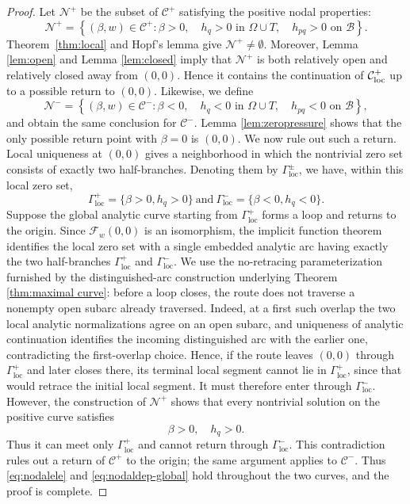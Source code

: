 \documentclass[12pt,letterpaper]{amsart}
\numberwithin{equation}{section}
\begin{document}
	\begin{proof}
		{Let $\mathcal N^+$ be the subset of $\mathcal C^+$ satisfying the positive nodal properties:}
		\begin{equation*}
			\mathcal{N}^+ = \left\{ (\beta,w) \in \mathcal{C}^+ : \beta > 0, \quad h_q > 0 \text{ in } \Omega \cup T, \quad h_{pq} > 0 {\text{ on }\mathcal B} \right\}.
		\end{equation*}
		{Theorem~\ref{thm:local} and Hopf's lemma give $\mathcal N^+\ne\emptyset$.} Moreover, Lemma \ref{lem:open} and Lemma \ref{lem:closed} imply that $\mathcal N^+$ is both relatively open and relatively closed away from $(0,0)$. Hence it contains the continuation of $\mathcal C_{\rm loc}^+$ up to a possible return to $(0,0)$. Likewise, we define
		\[\mathcal{N}^- = \left\{ (\beta,w) \in \mathcal{C}^- : \beta < 0, \quad h_q < 0 \text{ in } \Omega \cup T, \quad h_{pq} < 0 {\text{ on }\mathcal B} \right\},\]
		and obtain the same conclusion for $\mathcal C^-$. Lemma \ref{lem:zeropressure} shows that the only possible return point with $\beta=0$ is $(0,0)$. We now rule out such a return. {Local uniqueness at $(0,0)$ gives a neighborhood in which the nontrivial zero set consists of exactly two half-branches. Denoting them by $\Gamma_{\mathrm{loc}}^\pm$, we have, within this local zero set,}
 \begin{equation*}
 	\Gamma^+_{\mathrm{loc}}=\{\beta>0,h_q>0\}\mathrm{~and~}\Gamma^-_{\mathrm{loc}}=\{\beta<0,h_q<0\}.
 	\end{equation*}
	{Suppose the global analytic curve starting from $\Gamma^+_{\mathrm{loc}}$ forms a loop and returns to the origin. Since $\mathcal F_w(0,0)$ is an isomorphism, the implicit function theorem identifies the local zero set with a single embedded analytic arc having exactly the two half-branches $\Gamma^+_{\mathrm{loc}}$ and $\Gamma^-_{\mathrm{loc}}$. We use the no-retracing parameterization furnished by the distinguished-arc construction underlying Theorem \ref{thm:maximal curve}: before a loop closes, the route does not traverse a nonempty open subarc already traversed. Indeed, at a first such overlap the two local analytic normalizations agree on an open subarc, and uniqueness of analytic continuation identifies the incoming distinguished arc with the earlier one, contradicting the first-overlap choice. Hence, if the route leaves $(0,0)$ through $\Gamma^+_{\mathrm{loc}}$ and later closes there, its terminal local segment cannot lie in $\Gamma^+_{\mathrm{loc}}$, since that would retrace the initial local segment. It must therefore enter through $\Gamma^-_{\mathrm{loc}}$. However, the construction of $\mathcal N^+$ shows that every nontrivial solution on the positive curve satisfies}
 	\[\beta>0,\quad h_q>0.\]
	{Thus it can meet only $\Gamma_{\mathrm{loc}}^+$ and cannot return through $\Gamma_{\mathrm{loc}}^-$. This contradiction rules out a return of $\mathcal C^+$ to the origin; the same argument applies to $\mathcal C^-$.} Thus \eqref{eq:nodalele} and \eqref{eq:nodaldep-global}  hold throughout the two curves, and the proof is complete.
	\end{proof}
	
\end{document}
